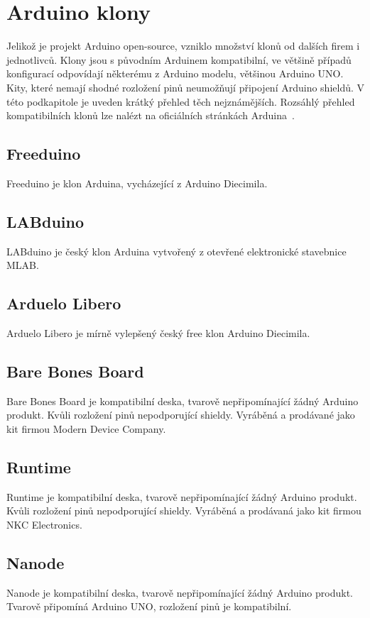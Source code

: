 \section{Arduino klony}
\label{KapArduinoKlony}

	Jelikož je projekt Arduino open-source, vzniklo množství klonů od dalších firem i jednotlivců. Klony jsou s původním Arduinem kompatibilní, ve většině případů konfigurací odpovídají některému z Arduino modelu, většinou Arduino UNO. Kity, které nemají shodné rozložení pinů neumožňují připojení Arduino shieldů. V této podkapitole je uveden krátký přehled těch nejznámějších. Rozsáhlý přehled kompatibilních klonů lze nalézt na oficiálních stránkách Arduina~\cite{ArduinoClonesWeb}.
	
	\subsection{Freeduino} 
	Freeduino je klon Arduina, vycházející z Arduino Diecimila.
	
	\subsection{LABduino} 
	LABduino je český klon Arduina vytvořený z otevřené elektronické stavebnice MLAB.
	
	\subsection{Arduelo Libero}	
	Arduelo Libero je mírně vylepšený český free klon Arduino Diecimila.
	
	\subsection{Bare Bones Board} 
	Bare Bones Board je kompatibilní deska, tvarově nepřipomínající žádný Arduino produkt. Kvůli rozložení pinů nepodporující shieldy. Vyráběná a prodávané jako kit firmou Modern Device Company.
	
	\subsection{Runtime} 
	Runtime je kompatibilní deska, tvarově nepřipomínající žádný Arduino produkt. Kvůli rozložení pinů nepodporující shieldy. Vyráběná a prodávaná jako kit firmou NKC Electronics.
	
	\subsection{Nanode} 
	Nanode je kompatibilní deska, tvarově nepřipomínající žádný Arduino produkt. Tvarově připomíná Arduino UNO, rozložení pinů je kompatibilní.
	
